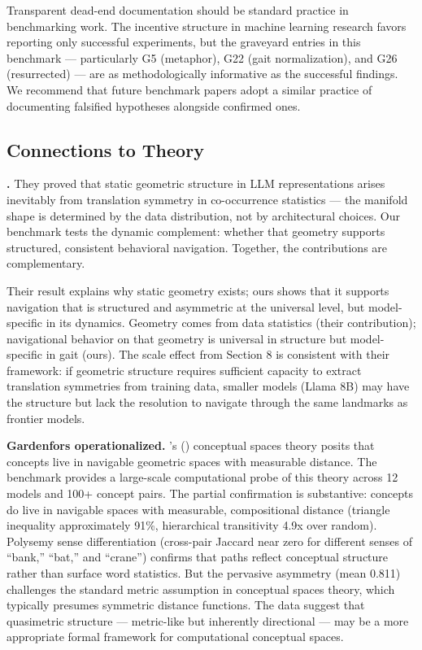 Transparent dead-end documentation should be standard practice in benchmarking work. The incentive structure in machine learning research favors reporting only successful experiments, but the graveyard entries in this benchmark --- particularly G5 (metaphor), G22 (gait normalization), and G26 (resurrected) --- are as methodologically informative as the successful findings. We recommend that future benchmark papers adopt a similar practice of documenting falsified hypotheses alongside confirmed ones.

\subsection{Connections to Theory}\label{connections-to-theory}

\textbf{\citet{karkada2025translation}.} They proved that static geometric structure in LLM representations arises inevitably from translation symmetry in co-occurrence statistics --- the manifold shape is determined by the data distribution, not by architectural choices. Our benchmark tests the dynamic complement: whether that geometry supports structured, consistent behavioral navigation. Together, the contributions are complementary.

Their result explains why static geometry exists; ours shows that it supports navigation that is structured and asymmetric at the universal level, but model-specific in its dynamics. Geometry comes from data statistics (their contribution); navigational behavior on that geometry is universal in structure but model-specific in gait (ours). The scale effect from Section 8 is consistent with their framework: if geometric structure requires sufficient capacity to extract translation symmetries from training data, smaller models (Llama 8B) may have the structure but lack the resolution to navigate through the same landmarks as frontier models.

\textbf{Gardenfors operationalized.} \citeauthor{gardenfors2000}'s (\citeyear{gardenfors2000}) conceptual spaces theory posits that concepts live in navigable geometric spaces with measurable distance. The benchmark provides a large-scale computational probe of this theory across 12 models and 100+ concept pairs. The partial confirmation is substantive: concepts do live in navigable spaces with measurable, compositional distance (triangle inequality approximately 91\%, hierarchical transitivity 4.9x over random). Polysemy sense differentiation (cross-pair Jaccard near zero for different senses of ``bank,'' ``bat,'' and ``crane'') confirms that paths reflect conceptual structure rather than surface word statistics. But the pervasive asymmetry (mean 0.811) challenges the standard metric assumption in conceptual spaces theory, which typically presumes symmetric distance functions. The data suggest that quasimetric structure --- metric-like but inherently directional --- may be a more appropriate formal framework for computational conceptual spaces.

